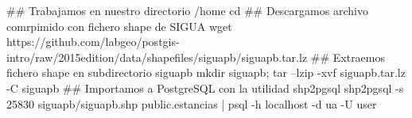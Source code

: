 \lstset{caption=Importación de estancias,label=bash:importarEstancias}
\begin{bash}
## Trabajamos en nuestro directorio /home
cd
## Descargamos archivo comrpimido con fichero shape de SIGUA
wget https://github.com/labgeo/postgis-intro/raw/2015edition/data/shapefiles/siguapb/siguapb.tar.lz
## Extraemos fichero shape en subdirectorio siguapb
mkdir siguapb; tar --lzip -xvf siguapb.tar.lz -C siguapb
## Importamos a PostgreSQL con la utilidad shp2pgsql
shp2pgsql -s 25830 siguapb/siguapb.shp public.estancias  | psql -h localhost -d ua -U user
\end{bash}
